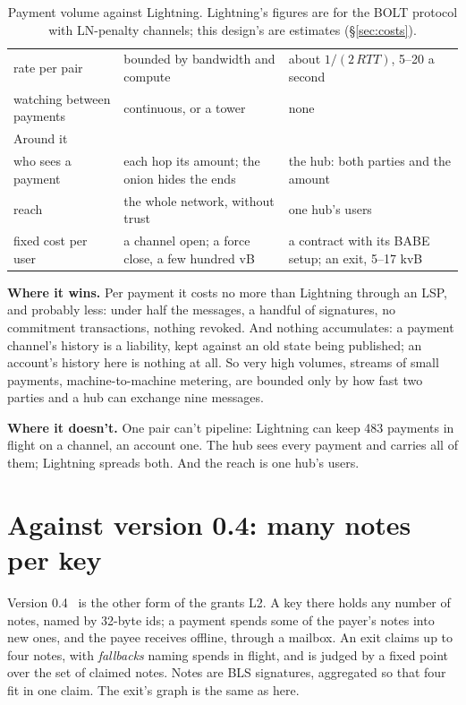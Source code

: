 \documentclass[11pt]{article}
\theoremstyle{plain}
\theoremstyle{definition}
\begin{document}
\begin{table}[!tbp]
\begin{tabularx}{\linewidth}{>{\raggedright\arraybackslash}p{2.7cm}LL}
rate per pair & bounded by bandwidth and compute & about $1/(2\,\mathit{RTT})$, 5--20 a second \\
watching between payments & continuous, or a tower & none \\
\midrule
Around it & & \\
\midrule
who sees a payment & each hop its amount; the onion hides the ends & the hub: both parties and the amount \\
reach & the whole network, without trust & one hub's users \\
fixed cost per user & a channel open; a force close, a few hundred vB & a contract with its BABE setup; an exit, 5--17 kvB \\
\bottomrule
\end{tabularx}
\caption{Payment volume against Lightning. Lightning's figures are for
the BOLT protocol with LN-penalty channels; this design's are
estimates (\S\ref{sec:costs}).}
\label{tab:ln}
\end{table}

\textbf{Where it wins.} Per payment it costs no more than Lightning
through an LSP, and probably less: under half the messages, a handful of
signatures, no commitment transactions, nothing revoked. And nothing
accumulates: a payment channel's history is a liability, kept against an
old state being published; an account's history here is nothing at all.
So very high volumes, streams of small payments, machine-to-machine
metering, are bounded only by how fast two parties and a hub can
exchange nine messages.

\textbf{Where it doesn't.} One pair can't pipeline: Lightning can keep
483 payments in flight on a channel, an account one. The hub sees every
payment and carries all of them; Lightning spreads both. And the reach
is one hub's users.

\section{Against version 0.4: many notes per key}\label{sec:compare}

Version 0.4~\cite{grants04} is the other form of the grants L2. A key
there holds any number of notes, named by 32-byte ids; a payment spends
some of the payer's notes into new ones, and the payee receives offline,
through a mailbox. An exit claims up to four notes, with \emph{fallbacks}
naming spends in flight, and is judged by a fixed point over the set of
claimed notes. Notes are BLS signatures, aggregated so that four fit in
one claim. The exit's graph is the same as here.
\end{document}
